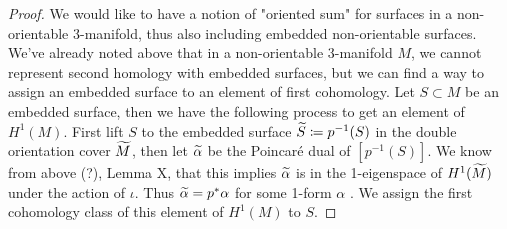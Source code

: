 \begin{proof}
We would like to have a notion of "oriented sum" for surfaces in a non-orientable 3-manifold, thus also including embedded non-orientable surfaces. We've already noted above that in a non-orientable 3-manifold $M$, we cannot represent second homology with embedded surfaces, but we can find a way to assign an embedded surface to an element of first cohomology. Let $S \subset M$ be an embedded surface, then we have the following process to get an element of $H^1(M)$. First lift $S$ to the embedded surface $\widetilde{S} \coloneqq p^{-1}(S)$ in the double orientation cover $\widetilde{M}$, then let $\widetilde{\alpha}$ be the Poincar\'e dual of $[p^{-1}(S)]$. We know from above (?), Lemma X, that this implies $\widetilde{\alpha}$ is in the 1-eigenspace of $H^1(\widetilde{M})$ under the action of $\iota$. Thus $\widetilde{\alpha} = p^*\alpha$ for some 1-form $\alpha$ . We assign the first cohomology class of this element of $H^1(M)$ to $S$. 

\end{proof}
